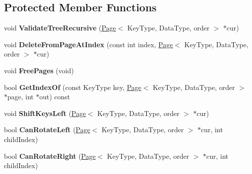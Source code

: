 \subsection*{Protected Member Functions}
\begin{DoxyCompactItemize}
\item 
\hypertarget{class_data_structures_1_1_b_plus_tree_af2df9815c4b1a9bda8d426c14e873bb6}{void {\bfseries Validate\-Tree\-Recursive} (\hyperlink{struct_data_structures_1_1_page}{Page}$<$ Key\-Type, Data\-Type, order $>$ $\ast$cur)}\label{class_data_structures_1_1_b_plus_tree_af2df9815c4b1a9bda8d426c14e873bb6}

\item 
\hypertarget{class_data_structures_1_1_b_plus_tree_a5ff8a5876ab576982650b7fb02205a48}{void {\bfseries Delete\-From\-Page\-At\-Index} (const int index, \hyperlink{struct_data_structures_1_1_page}{Page}$<$ Key\-Type, Data\-Type, order $>$ $\ast$cur)}\label{class_data_structures_1_1_b_plus_tree_a5ff8a5876ab576982650b7fb02205a48}

\item 
\hypertarget{class_data_structures_1_1_b_plus_tree_a0d8c994dbc67e9a9d23a5a829b6e84e8}{void {\bfseries Free\-Pages} (void)}\label{class_data_structures_1_1_b_plus_tree_a0d8c994dbc67e9a9d23a5a829b6e84e8}

\item 
\hypertarget{class_data_structures_1_1_b_plus_tree_ada2880997cd13505338358ce2c5365ac}{bool {\bfseries Get\-Index\-Of} (const Key\-Type key, \hyperlink{struct_data_structures_1_1_page}{Page}$<$ Key\-Type, Data\-Type, order $>$ $\ast$page, int $\ast$out) const }\label{class_data_structures_1_1_b_plus_tree_ada2880997cd13505338358ce2c5365ac}

\item 
\hypertarget{class_data_structures_1_1_b_plus_tree_a84da41ad11bd71d28d510b9941b9ae78}{void {\bfseries Shift\-Keys\-Left} (\hyperlink{struct_data_structures_1_1_page}{Page}$<$ Key\-Type, Data\-Type, order $>$ $\ast$cur)}\label{class_data_structures_1_1_b_plus_tree_a84da41ad11bd71d28d510b9941b9ae78}

\item 
\hypertarget{class_data_structures_1_1_b_plus_tree_a46efd46dde7ff95cb0f5d3ddae9156e7}{bool {\bfseries Can\-Rotate\-Left} (\hyperlink{struct_data_structures_1_1_page}{Page}$<$ Key\-Type, Data\-Type, order $>$ $\ast$cur, int child\-Index)}\label{class_data_structures_1_1_b_plus_tree_a46efd46dde7ff95cb0f5d3ddae9156e7}

\item 
\hypertarget{class_data_structures_1_1_b_plus_tree_a398b17d14837d5092d2d572ed742ce51}{bool {\bfseries Can\-Rotate\-Right} (\hyperlink{struct_data_structures_1_1_page}{Page}$<$ Key\-Type, Data\-Type, order $>$ $\ast$cur, int child\-Index)}\label{class_data_structures_1_1_b_plus_tree_a398b17d14837d5092d2d572ed742ce51}


\end{DoxyCompactItemize}
